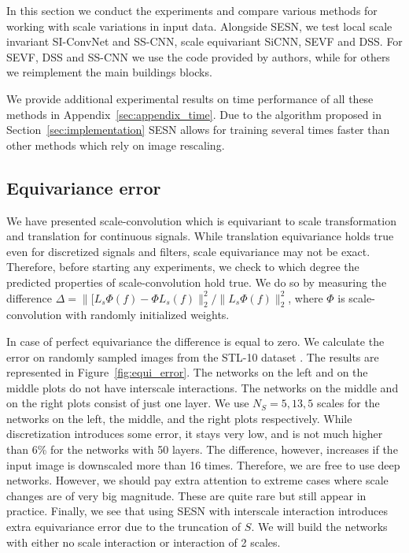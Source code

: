 \documentclass{article} \usepackage{multirow}
\def\Figref#1{Figure~\ref{#1}}
\def\Secref#1{Section~\ref{#1}}
\def\Apref#1{Appendix~\ref{#1}}
\begin{document}
In this section we conduct the experiments and compare various methods for 
working with scale variations in input data.
Alongside SESN, we test local scale invariant SI-ConvNet and SS-CNN, 
scale equivariant SiCNN, SEVF and DSS.
For SEVF, DSS and SS-CNN we use the code provided by authors, 
while for others we reimplement the main buildings blocks.

We provide additional experimental results on time performance of all these methods 
in \Apref{sec:appendix_time}. Due to the algorithm proposed in \Secref{sec:implementation}
SESN allows for training several times faster than other methods which rely on image rescaling.

\subsection{Equivariance error}
We have presented scale-convolution which is equivariant to 
scale transformation and translation for continuous signals. 
While translation equivariance holds 
true even for discretized signals and filters, scale equivariance 
may not be exact. Therefore, before starting any experiments,
we check to which degree the predicted properties of scale-convolution 
hold true. We do so by measuring the difference 
$\Delta = \|[L_s\Phi(f) - \Phi L_s(f)\|_2^2 / \|L_s\Phi(f)\|_2^2$, where 
$\Phi$ is scale-convolution with randomly initialized weights. 

In case of perfect equivariance the difference is equal to zero. 
We calculate the error on randomly sampled images 
from the STL-10 dataset \citet{coates2011analysis}. 
The results are represented in \Figref{fig:equi_error}. 
The networks on the left and on the middle plots do not have interscale interactions. The networks on the middle and on the right plots consist of just one layer. We use $N_S=5, 13, 5$ scales for the networks on the left, the middle, and the right plots respectively.
While discretization introduces some error, it stays very low, 
and is not much higher than 6\% for the networks with 50 layers. 
The difference, however, increases if the input image is downscaled more than 16 times.
Therefore, we are free to use deep networks. However, we 
should pay extra attention to extreme cases where scale changes are of 
very big magnitude. These are quite rare but still appear in practice.
Finally, we see that using SESN with interscale interaction introduces 
extra equivariance error due to the truncation of $S$. We will 
build the networks with either no scale interaction or interaction of 2 scales.
\end{document}
